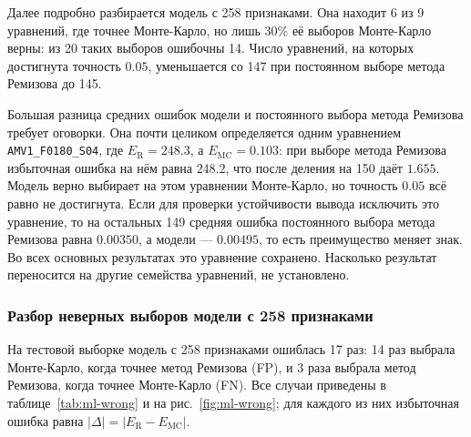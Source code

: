 \documentclass[14pt,a4paper]{extarticle}
\begin{document}
Далее подробно разбирается модель с 258 признаками.
Она находит 6 из 9 уравнений, где точнее Монте-Карло, но лишь 30\%
её выборов Монте-Карло верны: из 20 таких выборов ошибочны 14. Число
уравнений, на которых достигнута точность $0.05$, уменьшается со 147
при постоянном выборе метода Ремизова до 145.

Большая разница средних ошибок модели и постоянного выбора метода
Ремизова требует оговорки. Она почти целиком определяется одним
уравнением \texttt{AMV1\_F0180\_S04}, где $E_{\mathrm{R}}=248.3$,
а $E_{\mathrm{MC}}=0.103$: при выборе метода Ремизова избыточная ошибка
на нём равна $248.2$, что после деления на 150 даёт $1.655$. Модель верно
выбирает на этом уравнении Монте-Карло, но точность $0.05$ всё равно
не достигнута. Если для проверки устойчивости вывода исключить это
уравнение, то на остальных 149 средняя ошибка постоянного выбора метода
Ремизова равна $0.00350$, а модели --- $0.00495$, то есть преимущество
меняет знак. Во всех основных результатах это уравнение сохранено.
Насколько результат переносится на другие семейства уравнений,
не установлено.

\subsubsection{Разбор неверных выборов модели с 258 признаками}
На тестовой выборке модель с 258 признаками ошиблась 17 раз:
14 раз выбрала Монте-Карло, когда точнее метод Ремизова (FP),
и 3 раза выбрала метод Ремизова, когда
точнее Монте-Карло (FN). Все случаи приведены
в таблице~\ref{tab:ml-wrong} и на рис.~\ref{fig:ml-wrong}; для каждого
из них избыточная ошибка равна $|\Delta|=|E_{\mathrm{R}}-E_{\mathrm{MC}}|$.
\end{document}
